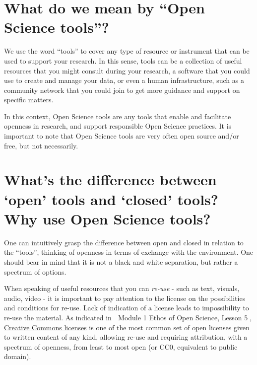 \documentclass[
  letterpaper,
  DIV=11,
  numbers=noendperiod]{scrreport}
\begin{document}
\hypertarget{what-do-we-mean-by-open-science-tools}{%
\section*{What do we mean by ``Open Science
tools''?}\label{what-do-we-mean-by-open-science-tools}}


We use the word ``tools'' to cover any type of resource or instrument
that can be used to support your research. In this sense, tools can be a
collection of useful resources that you might consult during your
research, a software that you could use to create and manage your data,
or even a human infrastructure, such as a community network that you
could join to get more guidance and support on specific matters.

In this context, Open Science tools are any tools that enable and
facilitate openness in research, and support responsible Open Science
practices. It is important to note that Open Science tools are very
often open source and/or free, but not necessarily.

\hypertarget{whats-the-difference-between-open-tools-and-closed-tools-why-use-open-science-tools}{%
\section*{What's the difference between `open' tools and `closed' tools?
Why use Open Science
tools?}\label{whats-the-difference-between-open-tools-and-closed-tools-why-use-open-science-tools}}


One can intuitively grasp the difference between open and closed in
relation to the ``tools'', thinking of openness in terms of exchange
with the environment. One should bear in mind that it is not a black and
white separation, but rather a spectrum of options.

When speaking of useful resources that you can \emph{re-use} - such as
text, visuals, audio, video - it is important to pay attention to the
license on the possibilities and conditions for re-use. Lack of
indication of a license leads to impossibility to re-use the material.
As indicated in 🔗 Module 1 Ethos of Open Science, Lesson 5🔗,
\href{https://creativecommons.org/}{Creative Commons licenses} is one of
the most common set of open licenses given to written content of any
kind, allowing re-use and requiring attribution, with a spectrum of
openness, from least to most open (or CC0, equivalent to public domain).
\end{document}
